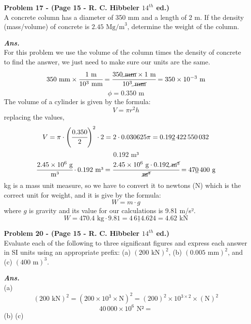 \documentclass[letterpaper, 11pt]{article}
\newenvironment{problem}[2][Problem]
    { \begin{mdframed} \textbf{#1 #2} \\}
    {  \end{mdframed}}
\newenvironment{solution}
    {\textbf{\textit{Ans.}}\\}
    { }
\begin{document}
\begin{problem}{17 - (Page 15 - R. C. Hibbeler $14^{th}$ ed.)}
    A concrete column has a diameter of 350 mm and
    a length of 2 m. If the density (mass/volume) of concrete is
    $2.45\text{ Mg/m}^3$, determine the weight of the column.
\end{problem}
\begin{solution}
    For this problem we use the volume of the column times the density of concrete to find the answer, we just need to make sure our units are the same.
\[350 \text{ mm}\times \cfrac{1\text{ m}}{10^3 \text{ mm}}=\cfrac{350 \cancel{\text{ mm}} \times 1\text{ m}}{10^3 \cancel{\text{ mm}}}=350 \times 10^{-3} \text{ m}\]
\[\phi =  0.350 \text{ m}\]
The volume of a cylinder is given by the formula:
\[V=\pi r^2 h\]
replacing the values,
\[V=\pi \cdot \left(\cfrac{0.350}{2}\right)^2 \cdot 2=2\cdot 0.030625\pi=0.19\underline{2}\,422\,550\,032\]
\[0.192\text{ m³}\]
\[\cfrac{2.45 \times 10^6 \text{ g}}{\text{m³}} \cdot 0.192 \text{ m³}=\cfrac{2.45 \times 10^6 \text{ g}\cdot 0.192 \cancel{\text{ m³}}}{\cancel{\text{m³}}} =47\underline{0}\,400\text{ g}\]
kg is a mass unit measure, so we have to convert it to newtons (N) which is the correct unit for weight, and it is give by the formula:
\[W=m\cdot g\]
where $g$ is gravity and its value for our calculations is 9.81 m/s².
\[W=470.4 \text{ kg} \cdot 9.81 = 4\, 6\underline{1}4.624=\boxed{4.62 \text{ kN}}\]
\end{solution}
\begin{problem}{20 - (Page 15 - R. C. Hibbeler $14^{th}$ ed.)}
    Evaluate each of the following to three significant
figures and express each answer in SI units using an
appropriate prefix: (a) $(200 \text{ kN})^2$, (b) $(0.005\text{ mm})^2$, and (c)
$(400\text{ m})^3$.
\end{problem}
\begin{solution}
 (a)
 \[(200 \text{ kN})^2=(200 \times 10^3 \times \text{N})^2=(200)^2\times 10^{3\times 2}\times (\text{N})^2\]
 \[40\, 000 \times 10^6 \text{ N²} =\]
 (b)
 (c)
\end{solution}
\end{document}
